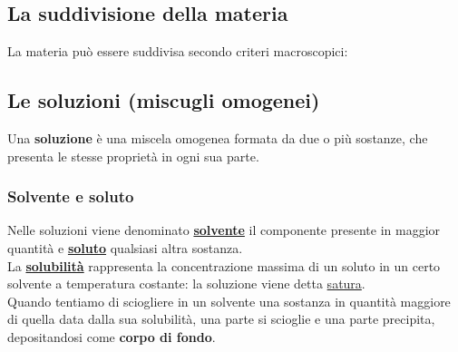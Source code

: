 \documentclass{article}
\begin{document}
\subsection{La suddivisione della materia}
La materia può essere suddivisa secondo criteri macroscopici:
\begin{center}
\end{center}

\subsection{Le soluzioni (miscugli omogenei)}
Una \textbf{soluzione} è una miscela omogenea formata da due o più sostanze, che presenta
le stesse proprietà in ogni sua parte.

\subsubsection{Solvente e soluto}
Nelle soluzioni viene denominato \textbf{\underline{solvente}} il componente presente in maggior
quantità e \textbf{\underline{soluto}} qualsiasi altra sostanza.\\
La \textbf{\underline{solubilità}} rappresenta la concentrazione massima di un soluto in un certo 
solvente a temperatura costante: la soluzione viene detta \underline{satura}.\\
Quando tentiamo di sciogliere in un solvente una sostanza in quantità maggiore di quella data 
dalla sua solubilità, una parte si scioglie e una parte precipita, depositandosi come \textbf{corpo di fondo}.
\end{document}
